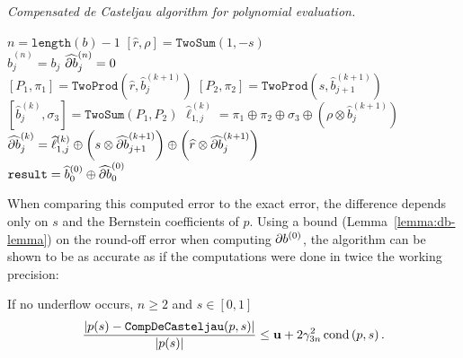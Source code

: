 \begin{breakablealgorithm}
  \caption{\textit{Compensated de Casteljau
      algorithm for polynomial evaluation.}}
  \label{alg:comp-de-casteljau}

  \begin{algorithmic}
      \State \(n = \texttt{length}(b) - 1\)
      \State \(\left[\widehat{r}, \rho\right] = \mathtt{TwoSum}(1, -s)\)
      \\
        \State \(\widehat{b}_j^{(n)} = b_j\)
        \State \(\cdb{1}_j^{(n)} = 0\)
      \EndFor
      \\
          \State \(\left[P_1, \pi_1\right] = \mathtt{TwoProd}\left(
              \widehat{r}, \widehat{b}_j^{(k + 1)}\right)\)
          \State \(\left[P_2, \pi_2\right] = \mathtt{TwoProd}\left(
              s, \widehat{b}_{j + 1}^{(k + 1)}\right)\)
          \State \(\left[\widehat{b}_j^{(k)}, \sigma_3\right] =
              \mathtt{TwoSum}(P_1, P_2)\)
          \State \(\widehat{\ell}_{1, j}^{(k)} = \pi_1 \oplus \pi_2 \oplus
              \sigma_3 \oplus \left(\rho \otimes
              \widehat{b}_j^{(k + 1)}\right)\)
          \State \(\cdb{1}_j^{(k)} =
              \widehat{\ell}_{1, j}^{(k)} \oplus
              \left(s \otimes \cdb{1}_{j + 1}^{(k + 1)}
              \right) \oplus
              \left(\widehat{r} \otimes
              \cdb{1}_j^{(k + 1)}\right)\)
        \EndFor
      \EndFor
      \\
      \State \(\mathtt{result} = \widehat{b}_0^{(0)} \oplus
          \cdb{1}_0^{(0)}\)
    \EndFunction
  \end{algorithmic}
\end{breakablealgorithm}

\noindent  When comparing this computed error to the exact error, the
difference depends only on \(s\) and the Bernstein
coefficients of \(p\). Using a bound (Lemma~\ref{lemma:db-lemma}) on the
round-off error when computing \(\db{1}^{(0)}\), the algorithm can
be shown to be as accurate as if the computations were done in twice
the working precision:

\begin{theorem}
  If no underflow occurs, \(n \geq 2\) and \(s \in \left[0, 1\right]\)
  \begin{equation}
    \frac{\left|p(s) - \mathtt{CompDeCasteljau}(p, s)\right|}{
      \left|p(s)\right|} \leq \mathbf{u} + 2 \gamma_{3n}^2 \operatorname{cond}\left(p, s\right).
  \end{equation}
\end{theorem}

